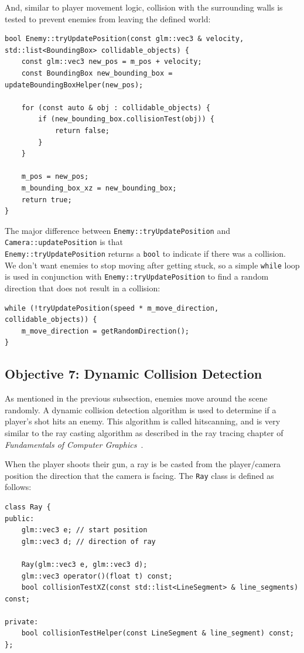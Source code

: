 \documentclass {article}
\begin{document}
And, similar to player movement logic, collision with the surrounding walls is tested to prevent enemies from leaving the defined world:
\begin{verbatim}
bool Enemy::tryUpdatePosition(const glm::vec3 & velocity, std::list<BoundingBox> collidable_objects) {
    const glm::vec3 new_pos = m_pos + velocity;
    const BoundingBox new_bounding_box = updateBoundingBoxHelper(new_pos);

    for (const auto & obj : collidable_objects) {
        if (new_bounding_box.collisionTest(obj)) {
            return false;
        }
    }

    m_pos = new_pos;
    m_bounding_box_xz = new_bounding_box;
    return true;
}
\end{verbatim}

The major difference between \texttt{Enemy::tryUpdatePosition} and \texttt{Camera::updatePosition} is that \\\texttt{Enemy::tryUpdatePosition} returns a \texttt{bool} to indicate if there was a collision. We don't want enemies to stop moving after getting stuck, so a simple \texttt{while} loop is used in conjunction with \texttt{Enemy::tryUpdatePosition} to find a random direction that does not result in a collision:
\begin{verbatim}
while (!tryUpdatePosition(speed * m_move_direction, collidable_objects)) {
    m_move_direction = getRandomDirection();
}
\end{verbatim}

\subsection{Objective 7: Dynamic Collision Detection}\label{sec:dynamic}
As mentioned in the previous subsection, enemies move around the scene randomly. A dynamic collision detection algorithm is used to determine if a player's shot hits an enemy. This algorithm is called hitscanning, and is very similar to the ray casting algorithm as described in the ray tracing chapter of \textit{Fundamentals of Computer Graphics}~\cite{rtbook}.

When the player shoots their gun, a ray is be casted from the player/camera position the direction that the camera is facing. The \texttt{Ray} class is defined as follows:
\begin{verbatim}
class Ray {
public:
    glm::vec3 e; // start position
    glm::vec3 d; // direction of ray

    Ray(glm::vec3 e, glm::vec3 d);
    glm::vec3 operator()(float t) const;
    bool collisionTestXZ(const std::list<LineSegment> & line_segments) const;

private:
    bool collisionTestHelper(const LineSegment & line_segment) const;
};
\end{verbatim}
\end{document}
